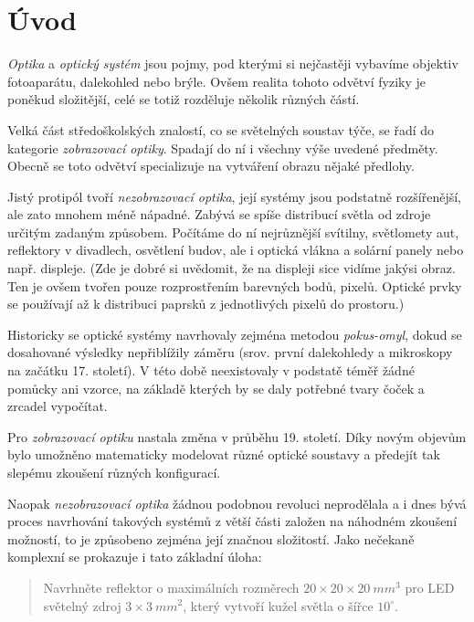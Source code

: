 \chapter{Úvod}


\emph{Optika} a \emph{optický systém} jsou pojmy, pod kterými si nejčastěji vybavíme objektiv fotoaparátu, dalekohled nebo brýle. Ovšem realita tohoto odvětví fyziky je poněkud složitější, celé se totiž rozděluje několik různých částí.

Velká část středoškolských znalostí, co se světelných soustav týče, se řadí do kategorie \emph{zobrazovací optiky}. Spadají do ní i všechny výše uvedené předměty. Obecně se toto odvětví specializuje na vytváření obrazu nějaké předlohy.

Jistý protipól tvoří \emph{nezobrazovací optika}, její systémy jsou podstatně rozšířenější, ale zato mnohem méně nápadné. Zabývá se spíše distribucí světla od zdroje určitým zadaným způsobem. Počítáme do ní nejrůznější svítilny, světlomety aut, reflektory v divadlech, osvětlení budov, ale i optická vlákna a solární panely nebo např. displeje. (Zde je dobré si uvědomit, že na displeji sice vidíme jakýsi obraz. Ten je ovšem tvořen pouze rozprostřením barevných bodů, pixelů. Optické prvky se používají až k distribuci paprsků z jednotlivých pixelů do prostoru.)

Historicky se optické systémy navrhovaly zejména metodou \emph{pokus-omyl}, dokud se dosahované výsledky nepřiblížily záměru (srov. první dalekohledy a mikroskopy na začátku 17. století). V této době neexistovaly v podstatě téměř žádné pomůcky ani vzorce, na základě kterých by se daly potřebné tvary čoček a zrcadel vypočítat. 

Pro \emph{zobrazovací optiku} nastala změna v průběhu 19. století. Díky novým objevům bylo umožněno matematicky modelovat různé optické soustavy a předejít tak slepému zkoušení různých konfigurací.\src

Naopak \emph{nezobrazovací optika} žádnou podobnou revoluci neprodělala a i dnes bývá proces navrhování takových systémů z větší části založen na náhodném zkoušení možností, to je způsobeno zejména její značnou složitostí. Jako nečekaně komplexní se prokazuje i tato základní úloha:

\begin{quote}
    Navrhněte reflektor o maximálních rozměrech $20\times20\times20\ mm^3$ pro LED světelný zdroj $3\times3\ mm^2$, který vytvoří kužel světla o šířce $10^{\circ}$.

\end{quote}

